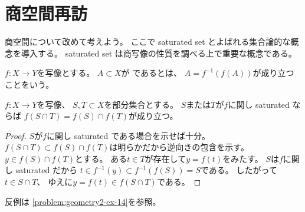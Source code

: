\documentclass[report]{jlreq}
\begin{document}
%
\chapter{商空間再訪}

商空間について改めて考えよう。
ここで saturated set とよばれる集合論的な概念を導入する。
saturated set は商写像の性質を調べる上で重要な概念である。

\begin{definition}
    $f \colon X \to Y$を写像とする。
    $A \subset X$が
    であるとは、
    $A = f^{-1}(f(A))$が成り立つことをいう。
\end{definition}

\begin{proposition}
    $f \colon X \to Y$を写像、
    $S, T \subset X$を部分集合とする。
    $S$または$T$が$f$に関し saturated ならば
    $f(S \cap T) = f(S) \cap f(T)$が成り立つ。
\end{proposition}

\begin{proof}
    $S$が$f$に関し saturated である場合を示せば十分。
    $f(S \cap T) \subset f(S) \cap f(T)$は明らかだから逆向きの包含を示す。
    $y \in f(S) \cap f(T)$とする。
    ある$t \in T$が存在して$y = f(t)$をみたす。
    $S$は$f$に関し saturated だから
    $t \in f^{-1}(y) \subset f^{-1}(f(S)) = S$である。
    したがって$t \in S \cap T$、
    ゆえに$y = f(t) \in f(S \cap T)$である。
\end{proof}


\begin{remark}
    反例は
    \cref{problem:geometry2-ex-14}を参照。
\end{remark}
\end{document}
